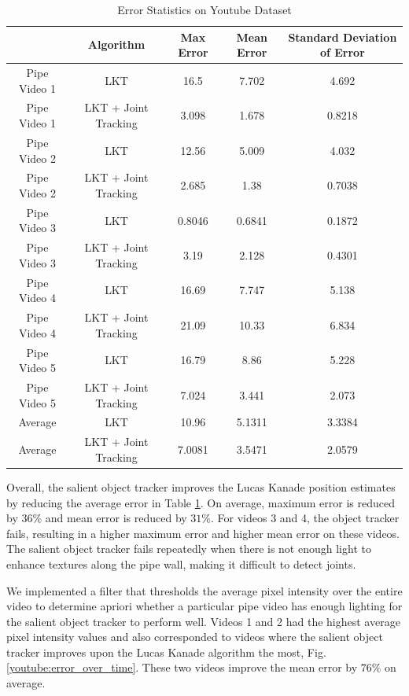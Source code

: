 \documentclass[letterpaper, 10 pt, conference]{ieeeconf}
\begin{document}
\begin{table}[tb] 
	\centering
	\footnotesize
	\setlength{\tabcolsep}{.5em}
	\caption{Error Statistics on Youtube Dataset}
	\label{table:youtube_results}
	\begin{tabular}{c|c|c|c|c|}
		\hline
		& Algorithm & Max Error & Mean Error & Standard Deviation of Error\\
		\hline
		Pipe Video 1 & LKT & 16.5 & 7.702 & 4.692 \\
		\rowcolor{Gray}
		Pipe Video 1 & LKT + Joint Tracking & 3.098 & 1.678 & 0.8218\\
		Pipe Video 2 & LKT & 12.56 & 5.009 & 4.032\\
		\rowcolor{Gray}
		Pipe Video 2 & LKT + Joint Tracking & 2.685 & 1.38 & 0.7038\\
		Pipe Video 3 & LKT & 0.8046 & 0.6841 & 0.1872 \\
		\rowcolor{Gray}
		Pipe Video 3 & LKT + Joint Tracking & 3.19 & 2.128 & 0.4301\\
		Pipe Video 4 & LKT & 16.69 & 7.747 & 5.138\\
		\rowcolor{Gray}
		Pipe Video 4 & LKT + Joint Tracking & 21.09 & 10.33 & 6.834\\
		Pipe Video 5 & LKT & 16.79 & 8.86 & 5.228 \\
		\rowcolor{Gray}
		Pipe Video 5 & LKT + Joint Tracking & 7.024 & 3.441 & 2.073\\
		\hline
		\hline
		Average  & LKT & 10.96 & 5.1311 & 3.3384 \\
		\rowcolor{Gray}
		Average & LKT + Joint Tracking & 7.0081 & 3.5471 & 2.0579\\
		\hline
	\end{tabular}
\end{table}


Overall, the salient object tracker improves the Lucas Kanade position estimates by reducing the average error in Table \ref{table:youtube_results}. On average, maximum error is reduced by $36 \%$ and mean error is reduced by $31 \%$. For videos 3 and 4, the object tracker fails, resulting in a higher maximum error and higher mean error on these videos. The salient object tracker fails repeatedly when there is not enough light to enhance textures along the pipe wall, making it difficult to detect joints.

We implemented a filter that thresholds the average pixel intensity over the entire video to determine apriori whether a particular pipe video has enough lighting for the salient object tracker to perform well. Videos 1 and 2 had the highest average pixel intensity values and also corresponded to videos where the salient object tracker improves upon the Lucas Kanade algorithm the most, Fig. \ref{youtube:error_over_time}. These two videos improve the mean error by $76 \%$ on average.
\end{document}
